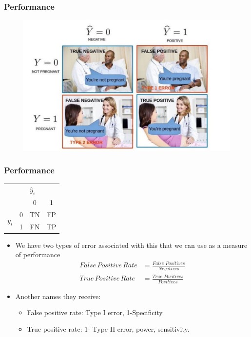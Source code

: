 \documentclass[
  shownotes,
  xcolor={svgnames},
  hyperref={colorlinks,citecolor=DarkBlue,linkcolor=andesred,urlcolor=DarkBlue}
  , aspectratio=169]{beamer}
\begin{document}
\begin{frame}[fragile]
\frametitle{Performance}


\begin{figure}[H] \centering
            \captionsetup{justification=centering}
              \includegraphics[scale=0.45]{figures/confusion_matrix}                            
 \end{figure}


\end{frame}
\begin{frame}[fragile]
\frametitle{Performance}


 \begin{table}[]
\begin{tabular}{cccc}
                      &    & \multicolumn{2}{l}{$\hat{y}_i$} \\
                      &      & 0           & 1          \\
\multirow{2}{*}{$y_i$} & 0    & TN          & FP         \\
                      & 1    & FN          & TP        
\end{tabular}
\end{table}




\begin{itemize}

  \item We have two types of error associated with this that we can use as a measure of performance
  \medskip
  \begin{align}
     False\,Positive\,Rate&=\frac{False\,\,Positives}{Negatives} \nonumber \\
     True\,Positive\,Rate&=\frac{True \,\,Positives}{Positives} 
  \end{align}
  \item Another names they receive:
  \begin{itemize}
    \item False positive rate: Type I error, 1-Specificity
    \item True positive rate: 1- Type II error, power, sensitivity.
  \end{itemize}
\end{itemize}

\end{frame}
\end{document}
